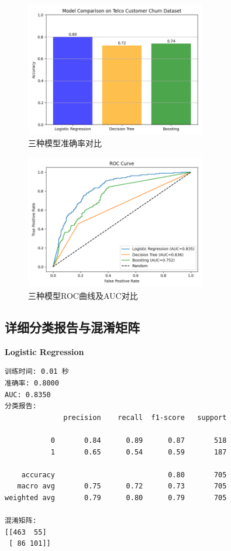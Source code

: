 \documentclass[12pt,a4paper]{article}
\begin{document}
\begin{figure}[H]
    \centering
    \includegraphics[width=0.7\textwidth]{fig/model_comparison.png}
    \caption{三种模型准确率对比}
\end{figure}

\begin{figure}[H]
    \centering
    \includegraphics[width=0.7\textwidth]{fig/roc_curve.png}
    \caption{三种模型ROC曲线及AUC对比}
\end{figure}

\subsection{详细分类报告与混淆矩阵}

\textbf{Logistic Regression}
\begin{lstlisting}
训练时间: 0.01 秒
准确率: 0.8000
AUC: 0.8350
分类报告:
              precision    recall  f1-score   support

           0       0.84      0.89      0.87       518
           1       0.65      0.54      0.59       187

    accuracy                           0.80       705
   macro avg       0.75      0.72      0.73       705
weighted avg       0.79      0.80      0.79       705

混淆矩阵:
[[463  55]
 [ 86 101]]
\end{lstlisting}
\end{document}
